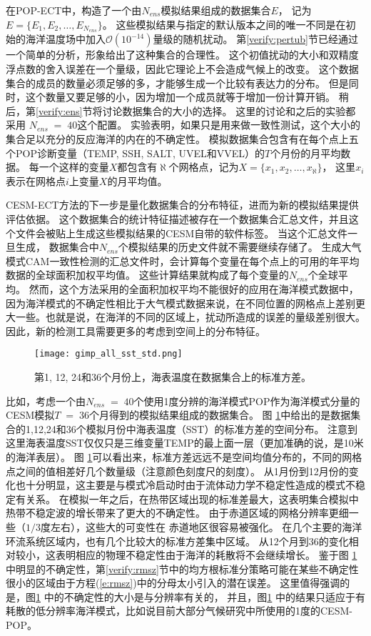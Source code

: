  
在POP-ECT中，构造了一个由$N_{ens}$模拟结果组成的数据集合$E$， 记为 $E =\{E_1, E_2, \dots, E_{N_{ens}} \}$。
这些模拟结果与指定的默认版本之间的唯一不同是在初始的海洋温度场中加入$\mathcal{O}(10^{-14})$量级的随机扰动。 
第\ref{verify:pertub}节已经通过一个简单的分析，形象给出了这种集合的合理性。
这个初值扰动的大小和双精度浮点数的舍入误差在一个量级，因此它理论上不会造成气候上的改变。
这个数据集合的成员的数量必须足够的多，才能够生成一个比较有表达力的分布。
但是同时，这个数量又要足够的小，因为增加一个成员就等于增加一份计算开销。 
稍后，第\ref{verify:ens}节将讨论数据集合的大小的选择。
这里的讨论和之后的实验都采用 $N_{ens} \;=\; 40$这个配置。
实验表明，如果只是用来做一致性测试，这个大小的集合足以充分的反应海洋的内在的不确定性。
模拟数据集合包含有在每个点上五个POP诊断变量（TEMP, SSH, SALT, UVEL和VVEL）的$T$个月份的月平均数据。
每一个这样的变量$X$都包含有$\aleph$个网格点，记为${X} = \{ x_1, x_2, \dots, x_{\aleph}\}$， 这里$x_i$ 表示在网格点$i$上变量$X$的月平均值。
 
CESM-ECT方法的下一步是量化数据集合的分布特征，进而为新的模拟结果提供评估依据。
这个数据集合的统计特征描述被存在一个数据集合汇总文件，并且这个文件会被贴上生成这些模拟结果的CESM自带的软件标签。
当这个汇总文件一旦生成， 数据集合中$N_{ens}$个模拟结果的历史文件就不需要继续存储了。
生成大气模式CAM一致性检测的汇总文件时，会计算每个变量在每个点上的可用的年平均数据的全球面积加权平均值。
这些计算结果就构成了每个变量的$N_{ens}$个全球平均。 
然而，这个方法采用的全面积加权平均不能很好的应用在海洋模式数据中，因为海洋模式的不确定性相比于大气模式数据来说，在不同位置的网格点上差别更大一些。也就是说，在海洋的不同的区域上，扰动所造成的误差的量级差别很大。
因此，新的检测工具需要更多的考虑到空间上的分布特征。 

\begin {figure} 
\centering
\texttt{[image: gimp\_all\_sst\_std.png]}
\caption{第1, 12, 24和36个月份上，海表温度在数据集合上的标准方差。}
\label{fig:SST_STD_all}
\end {figure}

比如，考虑一个由$N_{ens} \;=\; 40$个使用1度分辨的海洋模式POP作为海洋模式分量的CESM模拟$T\;=\;36$个月得到的模拟结果组成的数据集合。 
图 \ref{fig:SST_STD_all}中给出的是数据集合的1,12,24和36个模拟月份中海表温度（SST）的标准方差的空间分布。
注意到这里海表温度SST仅仅只是三维变量TEMP的最上面一层（更加准确的说，是10米的海洋表层）。
图 \ref{fig:SST_STD_all}可以看出来，标准方差远远不是空间均值分布的，不同的网格点之间的值相差好几个数量级（注意颜色刻度尺的刻度）。 
从1月份到12月份的变化也十分明显，这主要是与模式冷启动时由于流体动力学不稳定性造成的模式不稳定有关系。  
在模拟一年之后，在热带区域出现的标准差最大，这表明集合模拟中热带不稳定波的增长带来了更大的不确定性\cite{legeckis1977}。
由于赤道区域的网格分辨率更细一些（$1/3$度左右），这些大的可变性在 赤道地区很容易被强化。 
在几个主要的海洋环流系统区域内，也有几个比较大的标准方差集中区域。
从12个月到36的变化相对较小，这表明相应的物理不稳定性由于海洋的耗散将不会继续增长。
鉴于图 \ref{fig:SST_STD_all}中明显的不确定性，第\ref{verify:rmsz}节中的均方根标准分策略可能在某些不确定性很小的区域由于方程(\ref{e:rmsz})中的分母太小引入的潜在误差。
这里值得强调的是，图\ref{fig:SST_STD_all} 中的不确定性的大小是与分辨率有关的，
并且，图\ref{fig:SST_STD_all} 中的结果只适应于有耗散的低分辨率海洋模式，比如说目前大部分气候研究中所使用的1度的CESM-POP。

